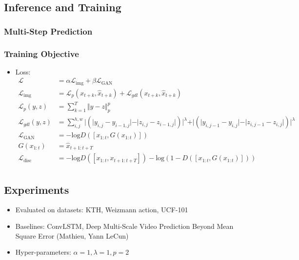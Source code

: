 \documentclass{article}
\begin{document}
    \subsection{Inference and Training}\label{subsec:Decomposing_Motion_and_Content_for_Natural_Video_Sequence_Prediction:inference-and-training}

    \subsubsection{Multi-Step Prediction}\label{subsubsec:Decomposing_Motion_and_Content_for_Natural_Video_Sequence_Prediction:multi-step-prediction}

    \subsubsection{Training Objective}\label{subsubsec:Decomposing_Motion_and_Content_for_Natural_Video_Sequence_Prediction:training-objective}
    \begin{itemize}
        \item Loss:
        \begin{align*}
            \mathcal{L} &= \alpha \mathcal{L}_{\textrm{img}} + \beta \mathcal{L}_{\textrm{GAN}} \\
            \mathcal{L}_{\textrm{img}} &= \mathcal{L}_p(x_{t+k}, \hat{x}_{t+k}) + \mathcal{L}_{gdl}(x_{t+k}, \hat{x}_{t+k}) \\
            \mathcal{L}_p(y,z) &= \sum_{k=1}^{T} \Vert y-z \Vert_p^p \\
            \mathcal{L}_{gdl}(y,z) &= \sum_{i,j}^{h,w} \vert (\vert y_{i,j} - y_{i-1,j} \vert - \vert z_{i,j} - z_{i-1,j}\vert) \vert^\lambda + \vert (\vert y_{i,j-1} - y_{i,j} \vert - \vert z_{i,j-1} - z_{i,j}\vert ) \vert^\lambda \\
            \mathcal{L}_{\textrm{GAN}} &= - \textrm{log} D([x_{1:t}, G(x_{1:t})]) \\
            G(x_{1:t}) &= \hat{x}_{t+1:t+T} \\
            \mathcal{L}_{\textrm{disc}} &= - \textrm{log} D([x_{1:t}, x_{t+1:t+T}]) - \textrm{log}(1 - D([x_{1:t}, G(x_{1:t})])) \\
        \end{align*}
    \end{itemize}

    \subsection{Experiments}\label{subsec:Decomposing_Motion_and_Content_for_Natural_Video_Sequence_Prediction:experiments}
    \begin{itemize}
        \item Evaluated on datasets: KTH, Weizmann action, UCF-101
        \item Baselines: ConvLSTM, Deep Multi-Scale Video Prediction Beyond Mean Square Error (Mathieu, Yann LeCun)
        \item Hyper-parameters: $\alpha=1, \lambda=1, p=2$
    \end{itemize}
\end{document}
